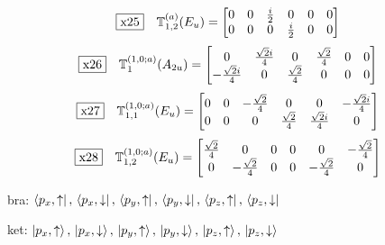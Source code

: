 \documentclass[fleqn,10pt,landscape]{jsarticle}
\begin{document}
\begin{dmath*}
\fbox{x25}\quad \mathbb{T}_{1,2}^{(a)}(E_{u})=\begin{bmatrix} 0 & 0 & \frac{i}{2} & 0 & 0 & 0 \\ 0 & 0 & 0 & \frac{i}{2} & 0 & 0 \end{bmatrix}
\end{dmath*}
\begin{dmath*}
\fbox{x26}\quad \mathbb{T}_{1}^{(1,0;a)}(A_{2u})=\begin{bmatrix} 0 & \frac{\sqrt{2} i}{4} & 0 & \frac{\sqrt{2}}{4} & 0 & 0 \\ - \frac{\sqrt{2} i}{4} & 0 & \frac{\sqrt{2}}{4} & 0 & 0 & 0 \end{bmatrix}
\end{dmath*}
\begin{dmath*}
\fbox{x27}\quad \mathbb{T}_{1,1}^{(1,0;a)}(E_{u})=\begin{bmatrix} 0 & 0 & - \frac{\sqrt{2}}{4} & 0 & 0 & - \frac{\sqrt{2} i}{4} \\ 0 & 0 & 0 & \frac{\sqrt{2}}{4} & \frac{\sqrt{2} i}{4} & 0 \end{bmatrix}
\end{dmath*}
\begin{dmath*}
\fbox{x28}\quad \mathbb{T}_{1,2}^{(1,0;a)}(E_{u})=\begin{bmatrix} \frac{\sqrt{2}}{4} & 0 & 0 & 0 & 0 & - \frac{\sqrt{2}}{4} \\ 0 & - \frac{\sqrt{2}}{4} & 0 & 0 & - \frac{\sqrt{2}}{4} & 0 \end{bmatrix}
\end{dmath*}
\vspace{5mm}

\noindent\textbullet\, bra: $\bra{p_{x},\uparrow},\, \bra{p_{x},\downarrow},\, \bra{p_{y},\uparrow},\, \bra{p_{y},\downarrow},\, \bra{p_{z},\uparrow},\, \bra{p_{z},\downarrow}$

\noindent\textbullet\, ket: $\ket{p_{x},\uparrow},\, \ket{p_{x},\downarrow},\, \ket{p_{y},\uparrow},\, \ket{p_{y},\downarrow},\, \ket{p_{z},\uparrow},\, \ket{p_{z},\downarrow}$
\end{document}
